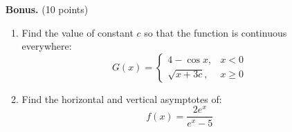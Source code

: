 \begin{enumerate}
    \item[\textbf{Bonus.}] (10 points)
    \begin{enumerate}
        \item Find the value of constant \( c \) so that the function is continuous everywhere:
        \[
        G(x) = 
        \begin{cases}
            4 - \cos x, & x < 0 \\
            \sqrt{x + 3c}, & x \geq 0
        \end{cases}
        \]

        \item Find the horizontal and vertical asymptotes of:
        \[
        f(x) = \frac{2e^x}{e^x - 5}
        \]
    \end{enumerate}
\end{enumerate}
